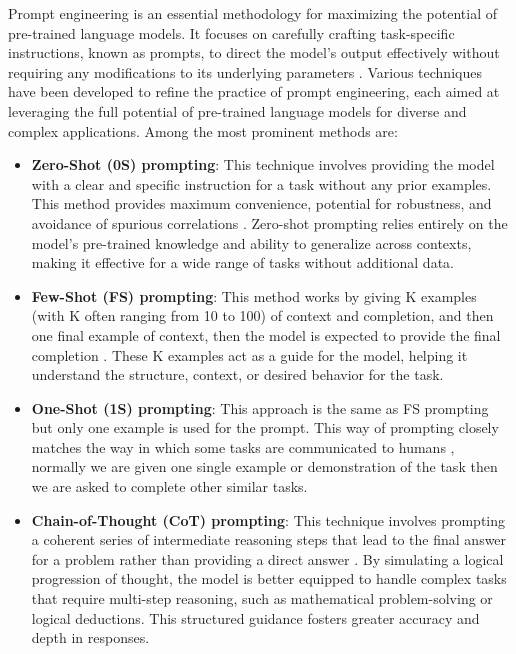 Prompt engineering is an essential methodology for maximizing the potential of pre-trained language models. It focuses on carefully crafting task-specific instructions, known as prompts, to direct the model's output effectively without requiring any modifications to its underlying parameters \cite{surveypromptengineering}. Various techniques have been developed to refine the practice of prompt engineering, each aimed at leveraging the full potential of pre-trained language models for diverse and complex applications. Among the most prominent methods are:
\begin{itemize}
    \item \textbf{Zero-Shot (0S) prompting}: This technique involves providing the model with a clear and specific instruction for a task without any prior examples. This method provides maximum convenience, potential for robustness, and avoidance of spurious correlations \cite{fewshot}. Zero-shot prompting relies entirely on the model's pre-trained knowledge and ability to generalize across contexts, making it effective for a wide range of tasks without additional data.
    \item \textbf{Few-Shot (FS) prompting}: This method works by giving K examples (with K often ranging from 10 to 100) of context and completion, and then one final example of context, then the model is expected to provide the final completion \cite{fewshot}. These K examples act as a guide for the model, helping it understand the structure, context, or desired behavior for the task.
    \item \textbf{One-Shot (1S) prompting}: This approach is the same as FS prompting but only one example is used for the prompt. This way of prompting closely matches the way in which some tasks are communicated to humans \cite{fewshot}, normally we are given one single example or demonstration of the task then we are asked to complete other similar tasks.
    \item \textbf{Chain-of-Thought (CoT) prompting}: This technique involves prompting a coherent series of intermediate reasoning steps that lead to the final answer for a problem rather than providing a direct answer \cite{chainofthought}. By simulating a logical progression of thought, the model is better equipped to handle complex tasks that require multi-step reasoning, such as mathematical problem-solving or logical deductions. This structured guidance fosters greater accuracy and depth in responses.

\end{itemize}



